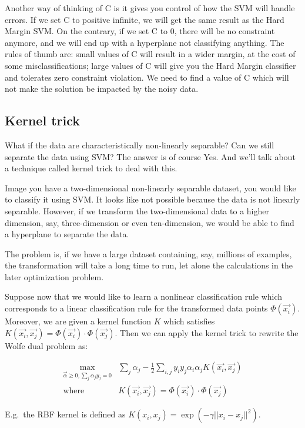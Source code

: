 \documentclass{article}
\begin{document}
Another way of thinking of C is it gives you control of how the SVM will handle errors. If we set C to positive infinite, we will get the same result as the Hard Margin SVM. On the contrary, if we set C to 0, there will be no constraint anymore, and we will end up with a hyperplane not classifying anything. The rules of thumb are: small values of C will result in a wider margin, at the cost of some misclassifications; large values of C will give you the Hard Margin classifier and tolerates zero constraint violation. We need to find a value of C which will not make the solution be impacted by the noisy data.

\subsection{Kernel trick}
What if the data are characteristically non-linearly separable? Can we still separate the data using SVM? The answer is of course Yes. And we’ll talk about a technique called kernel trick to deal with this.

Image you have a two-dimensional non-linearly separable dataset, you would like to classify it using SVM. It looks like not possible because the data is not linearly separable. However, if we transform the two-dimensional data to a higher dimension, say, three-dimension or even ten-dimension, we would be able to find a hyperplane to separate the data.

The problem is, if we have a large dataset containing, say, millions of examples, the transformation will take a long time to run, let alone the calculations in the later optimization problem.


Suppose now that we would like to learn a nonlinear classification rule which corresponds to a linear classification rule for the transformed data points $\Phi (\vec{x_i})$. Moreover, we are given a kernel function $K$ which satisfies $K(\vec{x_i}, \vec{x_j}) = \Phi (\vec{x_i}) \cdot \Phi (\vec{x_j})$. Then we can apply the kernel trick to rewrite the Wolfe dual problem as:

\begin{align*}
\max_{\vec{\alpha}\geq0, \sum_j \alpha_j y_j = 0} & \sum_j \alpha_j - \frac{1}{2} \sum_{i,j} y_iy_j\alpha_i\alpha_j K(\vec{x_i}, \vec{x_j}) \\
\mathrm{where} \quad & K(\vec{x_i}, \vec{x_j}) = \Phi (\vec{x_i}) \cdot \Phi (\vec{x_j})
\end{align*}


E.g.\, the RBF kernel is defined as $K(x_i,x_j)= \exp (- \gamma || x_i - x_j ||^2)$.
\end{document}
